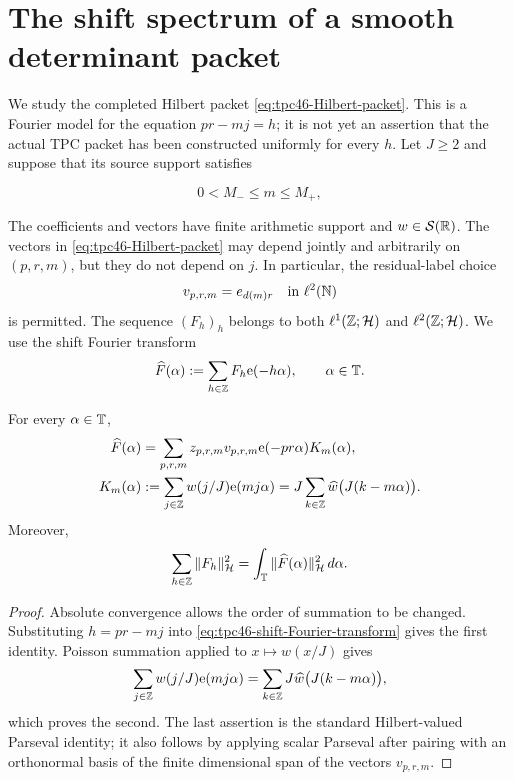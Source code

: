 \section{The shift spectrum of a smooth determinant packet}
\label{sec:tpc46-shift-spectrum}

We study the completed Hilbert packet
\eqref{eq:tpc46-Hilbert-packet}.  This is a Fourier model for the
equation \(pr-mj=h\); it is not yet an assertion that the actual TPC
packet has been constructed uniformly for every \(h\).  Let \(J\ge2\)
and suppose that its source support satisfies

\[
 0<M_-\le m\le M_+,
\]

The coefficients and vectors have finite arithmetic support and
\(w\in\mathcal S(\mathbb R)\).  The vectors in
\eqref{eq:tpc46-Hilbert-packet} may depend jointly and arbitrarily on
\((p,r,m)\), but they do not depend on \(j\).  In particular, the
residual-label choice
\begin{equation}
 v_{p,r,m}=e_{d(m)r}
 \quad\text{in }\ell^2(\mathbb N)
 \label{eq:tpc46-residual-basis-example}
\end{equation}
is permitted.  The sequence \((F_h)_h\) belongs to both
\(\ell^1(\mathbb Z;\mathcal H)\) and \(\ell^2(\mathbb Z;\mathcal H)\).  We use the shift Fourier
transform
\begin{equation}
 \widehat F(\alpha):=
 \sum_{h\in\mathbb Z}F_h\mathrm e(-h\alpha),
 \qquad \alpha\in\mathbb T.
 \label{eq:tpc46-shift-Fourier-transform}
\end{equation}

\begin{theorem}
\label{thm:tpc46-Hilbert-orbit-kernel}
For every \(\alpha\in\mathbb T\),
\begin{align}
 \widehat F(\alpha)
 &=\sum_{p,r,m}
   z_{p,r,m}v_{p,r,m}\mathrm e(-pr\alpha)K_m(\alpha),
 \label{eq:tpc46-shift-kernel-factorization}\\
 K_m(\alpha)
 &:=\sum_{j\in\mathbb Z}w(j/J)\mathrm e(mj\alpha)
   =J\sum_{k\in\mathbb Z}\widehat w\bigl(J(k-m\alpha)\bigr).
 \label{eq:tpc46-Poisson-orbit-kernel}
\end{align}
Moreover,
\begin{equation}
 \sum_{h\in\mathbb Z}\|F_h\|_{\mathcal H}^2
 =\int_{\mathbb T}\|\widehat F(\alpha)\|_{\mathcal H}^2\,d\alpha.
 \label{eq:tpc46-Hilbert-shift-Parseval}
\end{equation}
\end{theorem}

\begin{proof}
Absolute convergence allows the order of summation to be changed.
Substituting \(h=pr-mj\) into
\eqref{eq:tpc46-shift-Fourier-transform} gives the first identity.
Poisson summation applied to \(x\mapsto w(x/J)\) gives
\[
 \sum_{j\in\mathbb Z}w(j/J)\mathrm e(mj\alpha)
 =\sum_{k\in\mathbb Z}J\widehat w\bigl(J(k-m\alpha)\bigr),
\]
which proves the second.  The last assertion is the standard
Hilbert-valued Parseval identity; it also follows by applying scalar
Parseval after pairing with an orthonormal basis of the finite
dimensional span of the vectors \(v_{p,r,m}\).
\end{proof}

